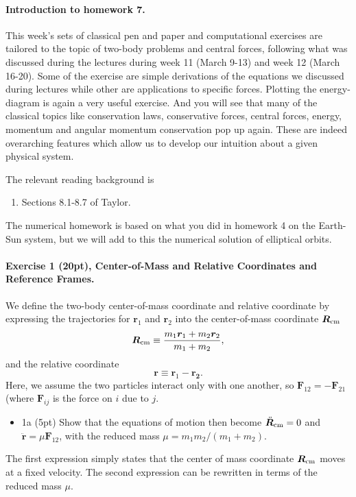 \documentclass[%
oneside,                 %
final,                   %
10pt]{article}
\begin{document}
\noindent
\paragraph{Introduction to homework 7.}
This week's sets of classical pen and paper and computational
exercises are tailored to the topic of two-body problems and central
forces, following what was discussed during the lectures during week
11 (March 9-13) and week 12 (March 16-20). Some of the exercise are
simple derivations of the equations we discussed during lectures while
other are applications to specific forces. Plotting the energy-diagram
is again a very useful exercise. And you will see that many of the
classical topics like conservation laws, conservative forces, central
forces, energy, momentum and angular momentum conservation pop up
again. These are indeed overarching features which allow us to develop
our intuition about a given physical system.

The relevant reading background is
\begin{enumerate}
\item Sections 8.1-8.7 of Taylor.
\end{enumerate}

\noindent
The numerical homework is based on what you did in homework 4 on the Earth-Sun system, but we will add to this the numerical solution of elliptical orbits. 


\paragraph{Exercise 1 (20pt), Center-of-Mass and Relative Coordinates and Reference Frames.}
We define the two-body center-of-mass coordinate and relative coordinate by expressing the trajectories for
$\bm{r}_1$ and $\bm{r}_2$ into the center-of-mass coordinate
$\bm{R}_{\rm cm}$ 
\[
\bm{R}_{\rm cm}\equiv\frac{m_1\bm{r}_1+m_2\bm{r}_2}{m_1+m_2},
\]
and the relative coordinate 
\[
\bm{r}\equiv\bm{r}_1-\bm{r_2}.
\]
Here, we assume the two particles interact only with one another, so $\bm{F}_{12}=-\bm{F}_{21}$ (where $\bm{F}_{ij}$ is the force on $i$ due to $j$.

\begin{itemize}
\item 1a (5pt) Show that the equations of motion then become $\ddot{\bm{R}}_{\rm cm}=0$ and $\ddot{\bm{r}}=\mu\bm{F}_{12}$, with the reduced mass $\mu=m_1m_2/(m_1+m_2)$.
\end{itemize}

\noindent
The first expression simply states that the center of mass coordinate $\bm{R}_{\rm cm}$ moves at a fixed velocity. The second expression can be rewritten in terms of the reduced mass $\mu$.
\end{document}
